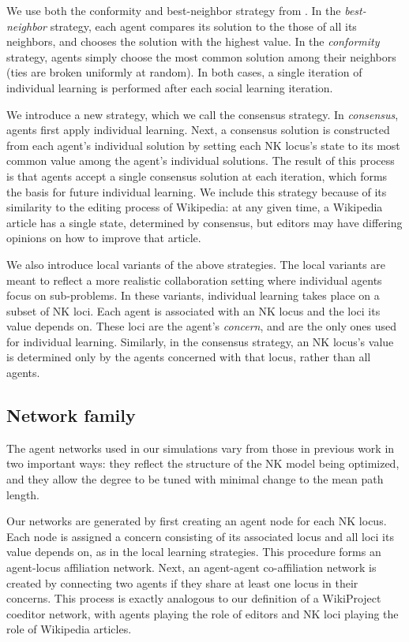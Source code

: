 We use both the conformity and best-neighbor strategy from \cite{barkoczi_social_2016}.
In the {\em best-neighbor} strategy, each agent compares its solution to the those of all its
neighbors, and chooses the solution with the highest value.
In the {\em conformity} strategy, agents simply choose the most common solution among their neighbors
(ties are broken uniformly at random).
In both cases, a single iteration of individual learning is performed after each social learning
iteration.

We introduce a new strategy, which we call the consensus strategy.
In {\em consensus}, agents first apply individual learning.
Next, a consensus solution is constructed from each agent's individual solution by setting
each NK locus's state to its most common value among the agent's individual solutions.
The result of this process is that agents accept a single consensus solution at each iteration,
which forms the basis for future individual learning.
We include this strategy because of its similarity to the editing process of Wikipedia:
at any given time, a Wikipedia article has a single state, determined by consensus,
but editors may have differing opinions on how to improve that article.

We also introduce local variants of the above strategies.
The local variants are meant to reflect a more realistic collaboration setting where
individual agents focus on sub-problems.
In these variants, individual learning takes place on a subset of NK loci.
Each agent is associated with an NK locus and the loci its value depends on.
These loci are the agent's {\em concern},
and are the only ones used for individual learning.
Similarly, in the consensus strategy, an NK locus's value is determined only by the agents
concerned with that locus, rather than all agents.

\subsection{Network family}

The agent networks used in our simulations vary from those in previous work in two important ways:
they reflect the structure of the NK model being optimized,
and they allow the degree to be tuned with minimal change to the mean path length.

Our networks are generated by first creating an agent node for each NK locus.
Each node is assigned a concern consisting of its associated locus and all loci its value depends on,
as in the local learning strategies.
This procedure forms an agent-locus affiliation network.
Next, an agent-agent co-affiliation network is created by connecting two agents if they share at least
one locus in their concerns.
This process is exactly analogous to our definition of a WikiProject coeditor network,
with agents playing the role of editors and NK loci playing the role of Wikipedia articles.

